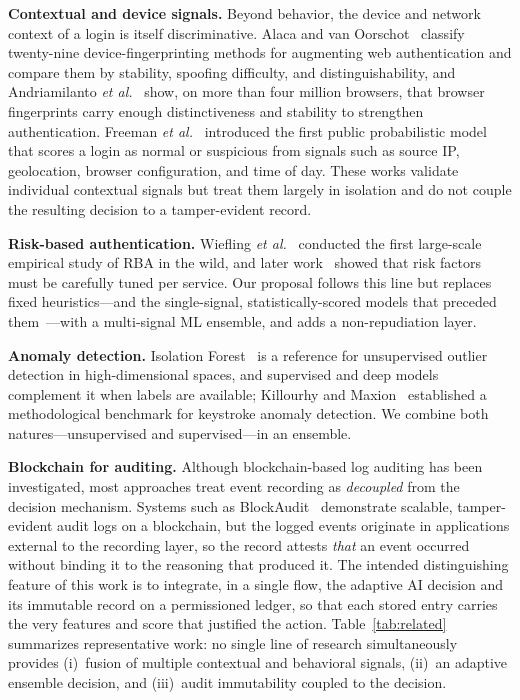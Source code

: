 \documentclass[conference]{IEEEtran}
\begin{document}
\textbf{Contextual and device signals.} Beyond behavior, the device and
network context of a login is itself discriminative. Alaca and van
Oorschot~\cite{alaca2016} classify twenty-nine device-fingerprinting
methods for augmenting web authentication and compare them by stability,
spoofing difficulty, and distinguishability, and Andriamilanto \emph{et
al.}~\cite{andriamilanto2021} show, on more than four million browsers,
that browser fingerprints carry enough distinctiveness and stability to
strengthen authentication. Freeman \emph{et al.}~\cite{freeman2016}
introduced the first public probabilistic model that scores a login as
normal or suspicious from signals such as source IP, geolocation,
browser configuration, and time of day. These works validate individual
contextual signals but treat them largely in isolation and do not couple
the resulting decision to a tamper-evident record.

\textbf{Risk-based authentication.} Wiefling \emph{et
al.}~\cite{wiefling2019} conducted the first large-scale empirical
study of RBA in the wild, and later work~\cite{wiefling2023} showed
that risk factors must be carefully tuned per service. Our proposal
follows this line but replaces fixed heuristics---and the single-signal,
statistically-scored models that preceded them~\cite{freeman2016}---with
a multi-signal ML ensemble, and adds a non-repudiation layer.

\textbf{Anomaly detection.} Isolation Forest~\cite{liu2008} is a
reference for unsupervised outlier detection in high-dimensional
spaces, and supervised and deep models~\cite{goodfellow2016} complement
it when labels are available; Killourhy and Maxion~\cite{killourhy2009}
established a methodological benchmark for keystroke anomaly detection.
We combine both natures---unsupervised and supervised---in an ensemble.

\textbf{Blockchain for auditing.} Although blockchain-based log
auditing has been investigated, most approaches treat event recording
as \emph{decoupled} from the decision mechanism. Systems such as
BlockAudit~\cite{blockaudit} demonstrate scalable, tamper-evident audit
logs on a blockchain, but the logged events originate in applications
external to the recording layer, so the record attests \emph{that} an
event occurred without binding it to the reasoning that produced it. The
intended distinguishing feature of this work is to integrate, in a single flow,
the adaptive AI decision and its immutable record on a permissioned
ledger, so that each stored entry carries the very features and score
that justified the action.
Table~\ref{tab:related} summarizes representative work: no single line
of research simultaneously provides (i)~fusion of multiple contextual
and behavioral signals, (ii)~an adaptive ensemble decision, and
(iii)~audit immutability coupled to the decision.
\end{document}
